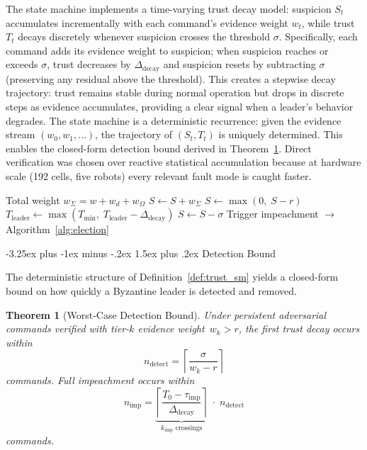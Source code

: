 \documentclass[conference]{IEEEtran}
\makeatletter
\newtheorem{theorem}{Theorem}
\renewcommand{\subsection}{\@startsection{subsection}{2}{\z@}%
  {-3.25ex plus -1ex minus -.2ex}%
  {1.5ex plus .2ex}%
  {\normalfont\normalsize\itshape\centering}}
\makeatother
\begin{document}
The state machine implements a time-varying trust decay model: suspicion $S_t$ accumulates incrementally with each command's evidence weight $w_t$, while trust $T_t$ decays discretely whenever suspicion crosses the threshold $\sigma$. Specifically, each command adds its evidence weight to suspicion; when suspicion reaches or exceeds $\sigma$, trust decreases by $\Delta_{\text{decay}}$ and suspicion resets by subtracting $\sigma$ (preserving any residual above the threshold). This creates a stepwise decay trajectory: trust remains stable during normal operation but drops in discrete steps as evidence accumulates, providing a clear signal when a leader's behavior degrades. The state machine is a deterministic recurrence: given the evidence stream $(w_0, w_1, \ldots)$, the trajectory of $(S_t, T_t)$ is uniquely determined. This enables the closed-form detection bound derived in Theorem~\ref{thm:detection}. Direct verification was chosen over reactive statistical accumulation because at hardware scale (192 cells, five robots) every relevant fault mode is caught faster.


\begin{algorithm}[h]
\caption{Suspicion Update and Trust Decay}
\label{alg:suspicion}
\begin{algorithmic}[1]
\REQUIRE Total weight $w_{\Sigma} = w + w_d + w_{\Omega}$
    \STATE $S \leftarrow S + w_{\Sigma}$
\ELSE
    \STATE $S \leftarrow \max(0,\; S - r)$
\ENDIF
{}
    \STATE $T_{\text{leader}} \leftarrow \max(T_{\min},\;
           T_{\text{leader}} - \Delta_{\text{decay}})$
    \STATE $S \leftarrow S - \sigma$
\ENDWHILE
{}
    \STATE Trigger impeachment $\to$ Algorithm~\ref{alg:election}
\ENDIF
\end{algorithmic}
\end{algorithm}

\subsection{Detection Bound}
\label{sec:detection_bound}

The deterministic structure of Definition~\ref{def:trust_sm} yields a closed-form bound on how quickly a Byzantine leader is detected and removed.

\begin{theorem}[Worst-Case Detection Bound]
\label{thm:detection}
Under persistent adversarial commands verified with tier-$k$ evidence weight~$w_k > r$, the first trust decay occurs within
\begin{equation}
    n_{\text{detect}} = \left\lceil \frac{\sigma}{w_k - r}
    \right\rceil
    \label{eq:detection_bound}
\end{equation}
commands. Full impeachment occurs within
\begin{equation}
    n_{\text{imp}} = \underbrace{\left\lceil
    \frac{T_0 - \tau_{\text{imp}}}{\Delta_{\text{decay}}}
    \right\rceil}_{k_{\text{imp}}\text{ crossings}} \;\cdot\;
    n_{\text{detect}}
    \label{eq:impeachment_bound}
\end{equation}
commands.
\end{theorem}
\end{document}
